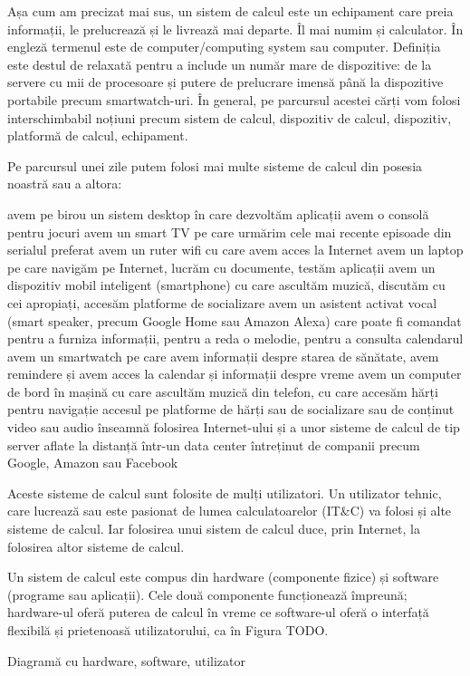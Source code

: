 Așa cum am precizat mai sus, un sistem de calcul este un echipament care preia informații, le prelucrează și le livrează mai departe. Îl mai numim și calculator. În engleză termenul este de computer/computing system sau computer. Definiția este destul de relaxată pentru a include un număr mare de dispozitive: de la servere cu mii de procesoare și putere de prelucrare imensă până la dispozitive portabile precum smartwatch-uri. În general, pe parcursul acestei cărți vom folosi interschimbabil noțiuni precum sistem de calcul, dispozitiv de calcul, dispozitiv, platformă de calcul, echipament.

Pe parcursul unei zile putem folosi mai multe sisteme de calcul din posesia noastră sau a altora:

avem pe birou un sistem desktop în care dezvoltăm aplicații
avem o consolă pentru jocuri
avem un smart TV pe care urmărim cele mai recente episoade din serialul preferat
avem un ruter wifi cu care avem acces la Internet
avem un laptop pe care navigăm pe Internet, lucrăm cu documente, testăm aplicații
avem un dispozitiv mobil inteligent (smartphone) cu care ascultăm muzică, discutăm cu cei apropiați, accesăm platforme de socializare
avem un asistent activat vocal (smart speaker, precum Google Home sau Amazon Alexa) care poate fi comandat pentru a furniza informații, pentru a reda o melodie, pentru a consulta calendarul
avem un smartwatch pe care avem informații despre starea de sănătate, avem remindere și avem acces la calendar și informații despre vreme
avem un computer de bord în mașină cu care ascultăm muzică din telefon, cu care accesăm hărți pentru navigație
accesul pe platforme de hărți sau de socializare sau de conținut video sau audio înseamnă folosirea Internet-ului și a unor sisteme de calcul de tip server aflate la distanță într-un data center întreținut de companii precum Google, Amazon sau Facebook

Aceste sisteme de calcul sunt folosite de mulți utilizatori. Un utilizator tehnic, care lucrează sau este pasionat de lumea calculatoarelor (IT&C) va folosi și alte sisteme de calcul. Iar folosirea unui sistem de calcul duce, prin Internet, la folosirea altor sisteme de calcul.

Un sistem de calcul este compus din hardware (componente fizice) și software (programe sau aplicații). Cele două componente funcționează împreună; hardware-ul oferă puterea de calcul în vreme ce software-ul oferă o interfață flexibilă și prietenoasă utilizatorului, ca în Figura TODO.

Diagramă cu hardware, software, utilizator

